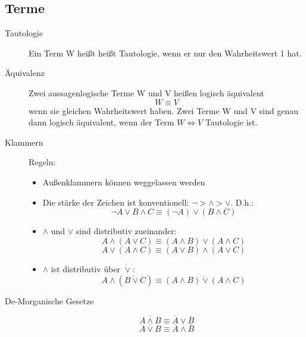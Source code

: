 \documentclass[12pt,a4paper]{article}
\begin{document}
\subsection{Terme}
\begin{description}
	\item[Tautologie] Ein Term W heißt heißt Tautologie, wenn er nur den Wahrheitswert 1 hat.
	\item[Äquivalenz] Zwei aussagenlogische Terme W und V heißen logisch äquivalent $$W \equiv V$$ wenn sie gleichen Wahrheitswert haben. Zwei Terme W und V sind genau dann logisch äquivalent, wenn der Term $W\Leftrightarrow V$ Tautologie ist.
	\item[Klammern] Regeln:
		\begin{itemize}
			\item Außenklammern können weggelassen werden
			\item Die stärke der Zeichen ist konventionell: $\neg > \wedge > \vee$. D.h.:
			      $$\neg A \vee B \wedge C \equiv (\neg A) \vee (B \wedge C)$$
			\item $\wedge$ und $\vee$ sind distributiv zueinander:
			      $$A \wedge (A \vee C) \equiv (A \wedge B) \vee (A \wedge C)$$
			      $$A \vee (A \wedge C) \equiv (A \vee B) \wedge (A \vee C)$$
			\item $\wedge$ ist distributiv über $\dot{\vee}$:
			      $$A \wedge (B \dot{\vee} C) \equiv (A \wedge B) \dot{\vee} (A \wedge C)$$
		\end{itemize}
	\item[De-Morganische Gesetze] $$\overline{A \wedge B} \equiv \overline{A} \vee \overline{B}$$ $$\overline{A \vee B} \equiv \overline{A} \wedge \overline{B}$$
\end{description}
\end{document}
